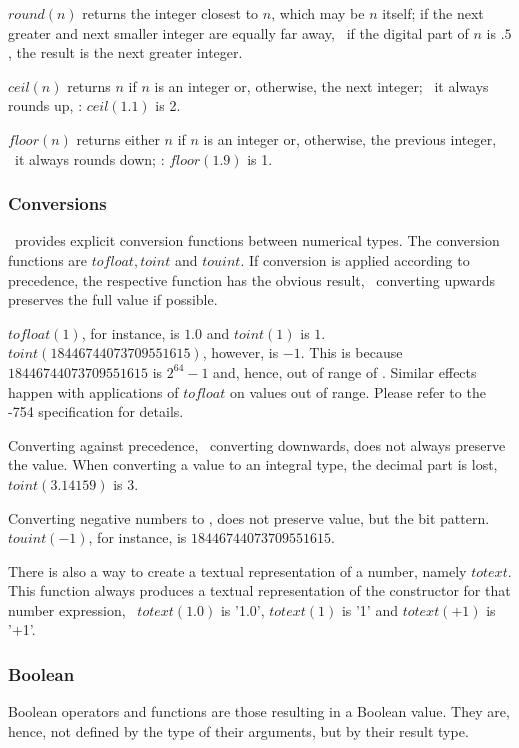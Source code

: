 $round(n)$ returns the integer closest to $n$,
which may be $n$ itself; if the next greater and
next smaller integer are equally far away,
\ie\ if the digital part of $n$ is $.5$,
the result is the next greater integer.

$ceil(n)$ returns $n$ if $n$ is an integer or,
otherwise, the next integer;
\ie\ it always rounds up, \eg: $ceil(1.1)$ is 2.

$floor(n)$ returns either $n$ if $n$ is an integer
or, otherwise, the previous integer, \ie\ it always rounds down;
\eg: $floor(1.9)$ is 1.

\subsubsection{Conversions}
\nowdb\ provides explicit conversion functions
between numerical types. The conversion functions
are   
$tofloat, toint$ and $touint$.
If conversion is applied according to precedence,
the respective function has the obvious result,
\ie\ converting upwards preserves the full value
if possible.

$tofloat(1)$, for instance, is $1.0$ and
$toint(1)$ is $1$.
$toint(18446744073709551615)$, however, is $-1$.
This is because $18446744073709551615$ is
$2^{64}-1$ and, hence, out of range of .
Similar effects happen with applications of
$tofloat$ on values out of range.
Please refer to the 
-754 specification for details.

Converting against precedence,
\ie\ converting downwards,
does not always preserve the value.
When converting a 
value to an integral type, the decimal part
is lost, \eg\ $toint(3.14159)$ is 3.

Converting negative numbers to ,
does not preserve value, but the bit pattern.
$touint(-1)$, for instance, is
$18446744073709551615$.

There is also a way to create a textual
representation of a number, namely $totext$.
This function always produces a textual
representation of the constructor for that
number expression,
\eg\ $totext(1.0)$ is '1.0',
$totext(1)$ is '1' and
$totext(+1)$ is '+1'.

\subsubsection{Boolean}
Boolean operators and functions
are those resulting in a Boolean value.
They are, hence, not defined by the type
of their arguments, but by their result type.

